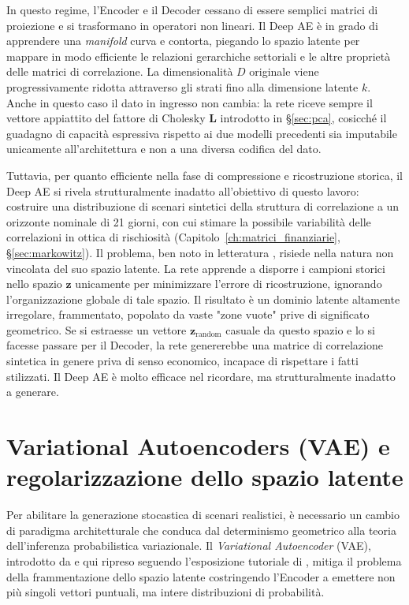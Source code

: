 In questo regime, l'Encoder e il Decoder cessano di essere semplici matrici di proiezione e si trasformano in operatori non lineari. Il Deep AE è in grado di apprendere una \emph{manifold} curva e contorta, piegando lo spazio latente per mappare in modo efficiente le relazioni gerarchiche settoriali e le altre proprietà delle matrici di correlazione. La dimensionalità $D$ originale viene progressivamente ridotta attraverso gli strati fino alla dimensione latente $k$. Anche in questo caso il dato in ingresso non cambia: la rete riceve sempre il vettore appiattito del fattore di Cholesky $\mathbf{L}$ introdotto in \S\ref{sec:pca}, cosicché il guadagno di capacità espressiva rispetto ai due modelli precedenti sia imputabile unicamente all'architettura e non a una diversa codifica del dato.

Tuttavia, per quanto efficiente nella fase di compressione e ricostruzione storica, il Deep AE si rivela strutturalmente inadatto all'obiettivo di questo lavoro: costruire una distribuzione di scenari sintetici della struttura di correlazione a un orizzonte nominale di 21 giorni, con cui stimare la possibile variabilità delle correlazioni in ottica di rischiosità (Capitolo~\ref{ch:matrici_finanziarie}, \S\ref{sec:markowitz}). Il problema, ben noto in letteratura \citep{kingma2013vae, doersch2016vae, burgess2018understanding}, risiede nella natura non vincolata del suo spazio latente. La rete apprende a disporre i campioni storici nello spazio $\mathbf{z}$ unicamente per minimizzare l'errore di ricostruzione, ignorando l'organizzazione globale di tale spazio. Il risultato è un dominio latente altamente irregolare, frammentato, popolato da vaste "zone vuote" prive di significato geometrico. Se si estraesse un vettore $\mathbf{z}_{\text{random}}$ casuale da questo spazio e lo si facesse passare per il Decoder, la rete genererebbe una matrice di correlazione sintetica in genere priva di senso economico, incapace di rispettare i fatti stilizzati. Il Deep AE è molto efficace nel ricordare, ma strutturalmente inadatto a generare.

\section{Variational Autoencoders (VAE) e regolarizzazione dello spazio latente}
\label{sec:vae}

Per abilitare la generazione stocastica di scenari realistici, è necessario un cambio di paradigma architetturale che conduca dal determinismo geometrico alla teoria dell'inferenza probabilistica variazionale. Il \emph{Variational Autoencoder} (VAE), introdotto da \citet{kingma2013vae} e qui ripreso seguendo l'esposizione tutoriale di \citet{doersch2016vae}, mitiga il problema della frammentazione dello spazio latente costringendo l'Encoder a emettere non più singoli vettori puntuali, ma intere distribuzioni di probabilità.

